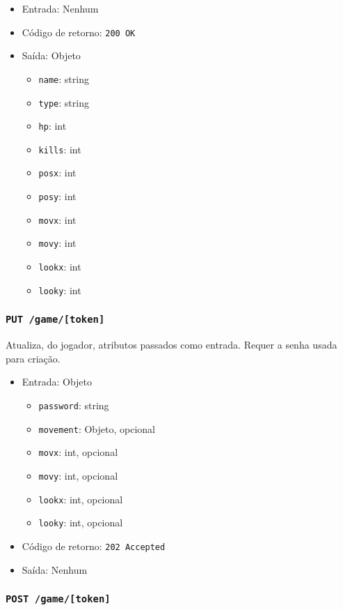 \documentclass[12pt,a4paper]{article}
\begin{document}
\begin{itemize}
	\item Entrada: Nenhum
	\item Código de retorno: \texttt{200 OK}
	\item Saída: Objeto
		\begin{itemize}
			\item \texttt{name}: string
			\item \texttt{type}: string
			\item \texttt{hp}: int
			\item \texttt{kills}: int
			\item \texttt{posx}: int
			\item \texttt{posy}: int
			\item \texttt{movx}: int
			\item \texttt{movy}: int
			\item \texttt{lookx}: int
			\item \texttt{looky}: int
		\end{itemize}
\end{itemize}

\subsubsection{\texttt{PUT /game/[token]}}

Atualiza, do jogador, atributos passados como entrada. Requer a senha usada
para criação.

\begin{itemize}
	\item Entrada: Objeto
		\begin{itemize}
			\item \texttt{password}: string
			\item \texttt{movement}: Objeto, opcional
			\item \texttt{movx}: int, opcional
			\item \texttt{movy}: int, opcional
			\item \texttt{lookx}: int, opcional
			\item \texttt{looky}: int, opcional
		\end{itemize}
	\item Código de retorno: \texttt{202 Accepted}
	\item Saída: Nenhum
\end{itemize}

\subsubsection{\texttt{POST /game/[token]}}
\end{document}
